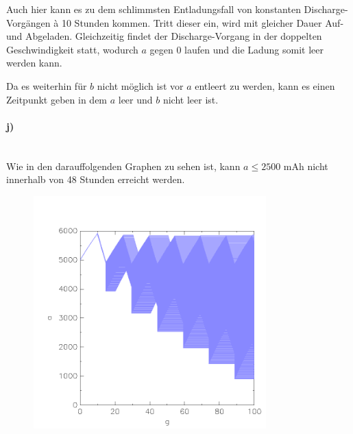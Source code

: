 Auch hier kann es zu dem schlimmsten Entladungsfall von konstanten Discharge-Vorgängen à 10 Stunden kommen. Tritt dieser ein, wird mit gleicher Dauer Auf- und Abgeladen. Gleichzeitig findet der Discharge-Vorgang in der doppelten Geschwindigkeit statt, wodurch $a$ gegen 0 laufen und die Ladung somit leer werden kann.  

Da es weiterhin für $b$ nicht möglich ist vor $a$ entleert zu werden, kann es einen Zeitpunkt geben in dem $a$ leer und $b$ nicht leer ist. 

\paragraph{j)}\mbox{} \\

Wie in den darauffolgenden Graphen zu sehen ist, kann $a\leq 2500$ mAh nicht innerhalb von 48 Stunden erreicht werden.  \\
\begin{minipage}[t]{0.5\textwidth} 
	\begin{figure}[H]
		\centering
		\includegraphics[width=0.8\textwidth]{Aufgabe_j1).png}
	\end{figure}
\end{minipage}
\hfill
